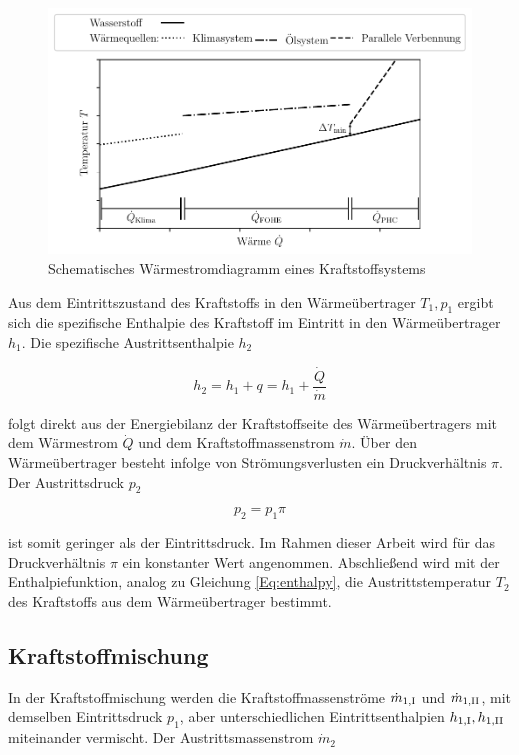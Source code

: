 \begin{figure}[ht]
	\centering
	\includegraphics[width=0.85\linewidth]{4_Abbildungen/2_Hauptteil/hx.pdf}
	\caption{Schematisches Wärmestromdiagramm eines Kraftstoffsystems}
	\label{fig:hx}
\end{figure}
\FloatBarrier 

Aus dem Eintrittszustand des Kraftstoffs in den Wärmeübertrager $T_1, p_1$ ergibt sich die spezifische Enthalpie des Kraftstoff im Eintritt in den Wärmeübertrager $h_1$. Die spezifische Austrittsenthalpie $h_2$

\begin{equation}\label{Eq:energy-hx}
	h_2=h_1 +q=h_1+\frac{\dot{Q}}{\dot{m}}
\end{equation}

folgt direkt aus der Energiebilanz der Kraftstoffseite des Wärmeübertragers mit dem Wärmestrom $\dot{Q}$ und dem Kraftstoffmassenstrom $\dot{m}$. Über den Wärmeübertrager besteht infolge von Strömungsverlusten ein Druckverhältnis $\pi$. Der Austrittsdruck $p_2$

\begin{equation}\label{Eq:pressuredrop}
	p_2 = p_1 \pi
\end{equation}

ist somit geringer als der Eintrittsdruck. Im Rahmen dieser Arbeit wird für das Druckverhältnis $\pi$ ein konstanter Wert angenommen. Abschließend wird mit der Enthalpiefunktion, analog zu Gleichung \ref{Eq:enthalpy}, die Austrittstemperatur $T_2$ des Kraftstoffs aus dem Wärmeübertrager bestimmt.

\subsection{Kraftstoffmischung}

In der Kraftstoffmischung werden die Kraftstoffmassenströme $\dot{m}_{1,\mathrm{\rom{1}}}$ und $\dot{m}_{1,\mathrm{\rom{2}}}$, mit demselben Eintrittsdruck $p_1$, aber unterschiedlichen Eintrittsenthalpien $h_{1,\mathrm{\rom{1}}}, h_{1,\mathrm{\rom{2}}}$ miteinander vermischt. Der Austrittsmassenstrom $\dot{m}_2$

